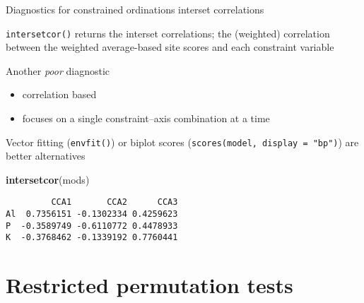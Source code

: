\documentclass[10pt,ignorenonframetext,compress, aspectratio=169]{beamer}
\newenvironment{Shaded}{\begin{snugshade}}{\end{snugshade}}
\newcommand{\KeywordTok}[1]{\textcolor[rgb]{0.13,0.29,0.53}{\textbf{{#1}}}}
\newcommand{\NormalTok}[1]{{#1}}
\begin{document}
\begin{frame}[fragile]{Diagnostics for constrained ordinations
\textbar{} interset correlations}

\texttt{intersetcor()} returns the interset correlations; the (weighted)
correlation between the weighted average-based site scores and each
constraint variable

Another \emph{poor} diagnostic

\begin{itemize}
\itemsep1pt\parskip0pt
\item
  correlation based
\item
  focuses on a single constraint--axis combination at a time
\end{itemize}

Vector fitting (\texttt{envfit()}) or biplot scores
(\texttt{scores(model,\ display\ =\ "bp")}) are better alternatives

\scriptsize

\begin{Shaded}
\begin{Highlighting}[]
\KeywordTok{intersetcor}\NormalTok{(mods)}
\end{Highlighting}
\end{Shaded}

\begin{verbatim}
         CCA1       CCA2      CCA3
Al  0.7356151 -0.1302334 0.4259623
P  -0.3589749 -0.6110772 0.4478933
K  -0.3768462 -0.1339192 0.7760441
\end{verbatim}

\normalsize

\end{frame}

\section{Restricted permutation
tests}\label{restricted-permutation-tests}
\end{document}

